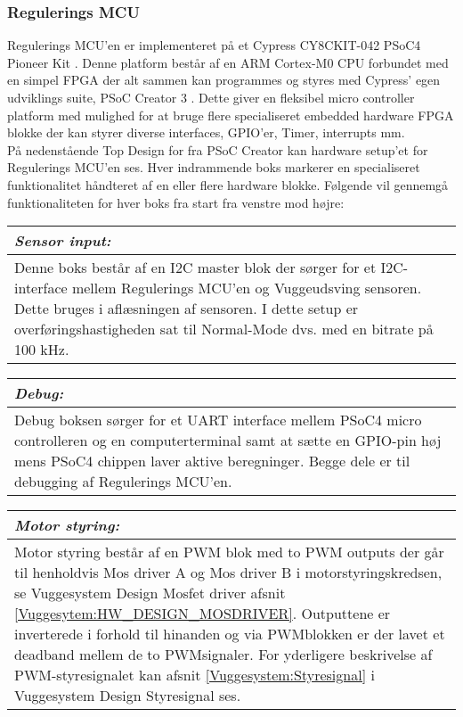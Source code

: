 \subsubsection{Regulerings MCU} \label{Vuggesystem: R_MCU} 
Regulerings MCU'en er implementeret på et Cypress CY8CKIT-042 PSoC4 Pioneer Kit \citep{website:Cypress}. Denne platform består af en ARM Cortex-M0 CPU forbundet med en simpel FPGA der alt sammen kan programmes og styres med Cypress' egen udviklings suite, PSoC Creator 3 \citep{website:PSoC_Creator}. Dette giver en fleksibel micro controller platform med mulighed for at bruge flere specialiseret embedded hardware FPGA blokke der kan styrer diverse interfaces, GPIO'er, Timer, interrupts mm. \\
På nedenstående Top Design for fra PSoC Creator kan hardware setup'et for Regulerings MCU'en ses. Hver indrammende boks markerer en specialiseret funktionalitet håndteret af en eller flere hardware blokke.
Følgende vil gennemgå funktionaliteten for hver boks fra start fra venstre mod højre:
\begin{center}
    \begin{tabular}{| p{14.5cm} |}
    \hline
    \textit{Sensor input:} \\ \hline
    Denne boks består af en I2C master blok der sørger for et I2C-interface mellem Regulerings MCU'en og Vuggeudsving sensoren. Dette bruges i aflæsningen af sensoren. I dette setup er overføringshastigheden sat til Normal-Mode dvs. med en bitrate på 100 kHz. \\ \hline
    \end{tabular}
\end{center}

\begin{center}
    \begin{tabular}{| p{14.5cm} |}
    \hline
    \textit{Debug:} \\ \hline
    Debug boksen sørger for et UART interface mellem PSoC4 micro controlleren og en computerterminal samt at sætte en GPIO-pin høj mens PSoC4 chippen laver aktive beregninger. Begge dele er til debugging af Regulerings MCU'en. \\ \hline
    \end{tabular}
\end{center}

\begin{center}
    \begin{tabular}{| p{14.5cm} |}
    \hline
    \textit{Motor styring:} \\ \hline
    Motor styring består af en PWM blok med to PWM outputs der går til henholdvis Mos driver A og Mos driver B i motorstyringskredsen, se Vuggesystem Design Mosfet driver afsnit \vref{Vuggesytem:HW_DESIGN_MOSDRIVER}. Outputtene er inverterede i forhold til hinanden og via PWMblokken er der lavet et deadband mellem de to PWMsignaler. For yderligere beskrivelse af PWM-styresignalet kan afsnit \vref{Vuggesystem:Styresignal} i Vuggesystem Design Styresignal ses. \\ \hline
    \end{tabular}
\end{center}


